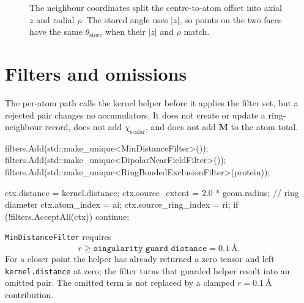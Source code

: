 \documentclass[11pt]{article}
\newcommand{\code}[1]{\texttt{#1}}
\begin{document}
\begin{figure}[ht]
\centering
{}
\caption{The neighbour coordinates split the centre-to-atom offset into axial
\(z\) and radial \(\rho\). The stored angle uses \(|z|\), so points on the two
faces have the same \(\theta_{\mathrm{store}}\) when their \(|z|\) and
\(\rho\) match.}
\end{figure}

\section{Filters and omissions}

The per-atom path calls the kernel helper before it applies the filter set, but
a rejected pair changes no accumulators. It does not create or update a
ring-neighbour record, does not add \(\chi_{\mathrm{scalar}}\), and does not
add \(\bm M\) to the atom total.

\begin{codebox}
filters.Add(std::make_unique<MinDistanceFilter>());
filters.Add(std::make_unique<DipolarNearFieldFilter>());
filters.Add(std::make_unique<RingBondedExclusionFilter>(protein));

ctx.distance = kernel.distance;
ctx.source_extent = 2.0 * geom.radius;       // ring diameter
ctx.atom_index = ai;
ctx.source_ring_index = ri;
if (!filters.AcceptAll(ctx)) continue;
\end{codebox}

\code{MinDistanceFilter} requires
\[
  r \ge \code{singularity\_guard\_distance}
    = \SI{0.1}{\angstrom}.
\]
For a closer point the helper has already returned a zero tensor and left
\code{kernel.distance} at zero; the filter turns that guarded helper result
into an omitted pair. The omitted term is not replaced by a clamped
\(r=\SI{0.1}{\angstrom}\) contribution.
\end{document}
